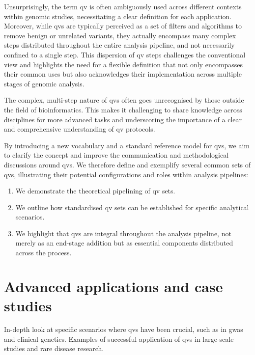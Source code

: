 Unsurprisingly, the term \ac{qv} is often ambiguously used across different contexts within genomic studies, necessitating a clear definition for each application. 
Moreover, while \ac{qv}s are typically perceived as a set of filters and algorithms to remove benign or unrelated variants, they actually encompass many complex steps distributed throughout the entire analysis pipeline, and not necessarily confined to a single step. 
This dispersion of \ac{qv} steps challenges the conventional view and highlights the need for a flexible definition that not only encompasses their common uses but also acknowledges their implementation across multiple stages of genomic analysis.

The complex, multi-step nature of \ac{qv}s often goes unrecognised by those outside the field of bioinformatics.
This makes it challenging to share knowledge across disciplines for more advanced tasks and underscoring the importance of a clear and comprehensive understanding of \ac{qv} protocols.

By introducing a new vocabulary and a standard reference model for \ac{qv}s, we aim to clarify the concept and improve the communication and methodological discussions around \ac{qv}s. 
We therefore define and exemplify several common sets of \ac{qv}s, illustrating their potential configurations and roles within analysis pipelines:

\begin{enumerate}
    \item We demonstrate the theoretical pipelining of \ac{qv} sets.
    \item We outline how standardised \ac{qv} sets can be established for specific analytical scenarios.
    \item We highlight that \ac{qv}s are integral throughout the analysis pipeline, not merely as an end-stage addition but as essential components distributed across the process.
\end{enumerate}

\section{Advanced applications and case studies}
In-depth look at specific scenarios where \ac{qv}s have been crucial, such as in \ac{gwas} and clinical genetics. Examples of successful application of \ac{qv}s in large-scale studies and rare disease research.

